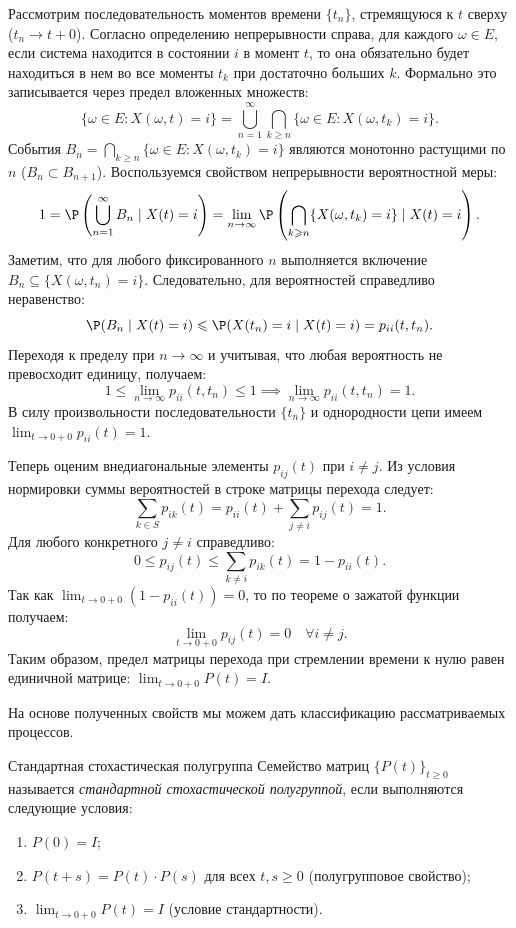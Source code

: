\begin{tproof}
    Рассмотрим последовательность моментов времени $\{t_n\}$, стремящуюся к $t$ сверху ($t_n \to t + 0$). Согласно определению непрерывности справа, для каждого $\omega \in E$, если система находится в состоянии $i$ в момент $t$, то она обязательно будет находиться в нем во все моменты $t_k$ при достаточно больших $k$. Формально это записывается через предел вложенных множеств:
    \[
    \{\omega \in E : X(\omega, t) = i\} = \bigcup_{n=1}^{\infty} \bigcap_{k \geqslant n} \{\omega \in E : X(\omega, t_k) = i\}.
    \]
    События $B_n = \bigcap_{k \geqslant n} \{\omega \in E : X(\omega, t_k) = i\}$ являются монотонно растущими по $n$ ($B_n \subset B_{n+1}$). Воспользуемся свойством непрерывности вероятностной меры:
    \[
    1 = \P\left( \bigcup_{n=1}^{\infty} B_n \mid X(t) = i \right) = \lim_{n \to \infty} \P\left( \bigcap_{k \geqslant n} \{X(\omega, t_k) = i\} \mid X(t) = i \right).
    \]
    Заметим, что для любого фиксированного $n$ выполняется включение $B_n \subseteq \{X(\omega, t_n) = i\}$. Следовательно, для вероятностей справедливо неравенство:
    \[
    \P(B_n \mid X(t) = i) \leqslant \P(X(t_n) = i \mid X(t) = i) = p_{ii}(t, t_n).
    \]
    Переходя к пределу при $n \to \infty$ и учитывая, что любая вероятность не превосходит единицу, получаем:
    \[
    1 \leqslant \lim_{n \to \infty} p_{ii}(t, t_n) \leqslant 1 \implies \lim_{n \to \infty} p_{ii}(t, t_n) = 1.
    \]
    В силу произвольности последовательности $\{t_n\}$ и однородности цепи имеем $\lim_{t \to 0+0} p_{ii}(t) = 1$.

    Теперь оценим внедиагональные элементы $p_{ij}(t)$ при $i \neq j$. Из условия нормировки суммы вероятностей в строке матрицы перехода следует:
    \[
    \sum_{k \in S} p_{ik}(t) = p_{ii}(t) + \sum_{j \neq i} p_{ij}(t) = 1.
    \]
    Для любого конкретного $j \neq i$ справедливо:
    \[
    0 \leqslant p_{ij}(t) \leqslant \sum_{k \neq i} p_{ik}(t) = 1 - p_{ii}(t).
    \]
    Так как $\lim_{t \to 0+0} (1 - p_{ii}(t)) = 0$, то по теореме о зажатой функции получаем:
    \[
    \lim_{t \to 0+0} p_{ij}(t) = 0 \quad \forall i \neq j.
    \]
    Таким образом, предел матрицы перехода при стремлении времени к нулю равен единичной матрице: $\lim_{t \to 0+0} P(t) = I$.
\end{tproof}

На основе полученных свойств мы можем дать классификацию рассматриваемых процессов.

\begin{definition}{Стандартная стохастическая полугруппа}
    Семейство матриц $\{P(t)\}_{t \geqslant 0}$ называется \textit{стандартной стохастической полугруппой}, если выполняются следующие условия:
    \begin{enumerate}
        \item $P(0) = I$;
        \item $P(t+s) = P(t) \cdot P(s)$ для всех $t, s \geqslant 0$ (полугрупповое свойство);
        \item $\lim_{t \to 0+0} P(t) = I$ (условие стандартности).
    \end{enumerate}
\end{definition}    

